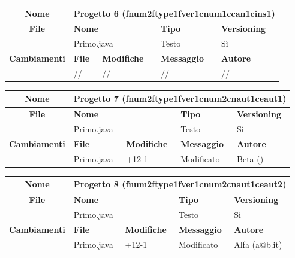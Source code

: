 \begin{table}[ht]
\footnotesize
\begin{tabular}{|c|p{2.5cm}|p{2cm}|p{2.5cm}|p{2.5cm}|}
  \hline
  \textbf{Nome}	& \multicolumn{4}{l|}{Progetto 6 (fnum2ftype1fver1cnum1ccan1cins1)} 									\\
  \hline
  \rowcolor{lightgray}\textbf{File} 		& \multicolumn{2}{l|}{\textbf{Nome}}		& \textbf{Tipo}		& \textbf{Versioning} 		\\
						\cline{2-5}
						& \multicolumn{2}{l|}{Primo.java}		& Testo			& Sì				\\
  \hline
  \rowcolor{lightgray}\textbf{Cambiamenti}	& \textbf{File}		&\textbf{Modifiche}	& \textbf{Messaggio}	& \textbf{Autore}		\\
						\cline{2-5}
						& //			& //	  		& //			& //				\\
						
  \hline
\end{tabular}
\end{table}

\begin{table}[ht]
\footnotesize
\begin{tabular}{|c|p{2.5cm}|p{2cm}|p{2.5cm}|p{2.5cm}|}
  \hline
  \textbf{Nome}	& \multicolumn{4}{l|}{Progetto 7 (fnum2ftype1fver1cnum2cnaut1ceaut1)} 									\\
  \hline
  \rowcolor{lightgray}\textbf{File} 		& \multicolumn{2}{l|}{\textbf{Nome}}		& \textbf{Tipo}		& \textbf{Versioning} 		\\
						\cline{2-5}
						& \multicolumn{2}{l|}{Primo.java}		& Testo			& Sì				\\
  \hline
  \rowcolor{lightgray}\textbf{Cambiamenti}	& \textbf{File}		&\textbf{Modifiche}	& \textbf{Messaggio}	& \textbf{Autore}		\\
						\cline{2-5}
						& Primo.java		& +12-1	 		& Modificato		& Beta ()			\\
						
  \hline
\end{tabular}
\end{table}

\begin{table}[ht]
\footnotesize
\begin{tabular}{|c|p{2.5cm}|p{2cm}|p{2.5cm}|p{2.5cm}|}
  \hline
  \textbf{Nome}	& \multicolumn{4}{l|}{Progetto 8 (fnum2ftype1fver1cnum2cnaut1ceaut2)} 									\\
  \hline
  \rowcolor{lightgray}\textbf{File} 		& \multicolumn{2}{l|}{\textbf{Nome}}		& \textbf{Tipo}		& \textbf{Versioning} 		\\
						\cline{2-5}
						& \multicolumn{2}{l|}{Primo.java}		& Testo			& Sì				\\
  \hline
  \rowcolor{lightgray}\textbf{Cambiamenti}	& \textbf{File}		&\textbf{Modifiche}	& \textbf{Messaggio}	& \textbf{Autore}		\\
						\cline{2-5}
						& Primo.java		& +12-1	  		& Modificato		& Alfa (a@b.it)			\\
						
  \hline
\end{tabular}
\end{table}

